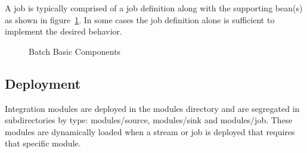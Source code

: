 \par

A job is typically comprised of a job definition along with the supporting
bean(s) as shown in figure~\ref{fig:batchmbc}.
In some cases the job definition alone is sufficient to implement the desired behavior.

\par

\begin{figure}
\centering
{}
\caption{Batch Basic Components}
\label{fig:batchmbc}
\end{figure}

\subsection{Deployment}
Integration modules are deployed in the modules directory and are segregated in
subdirectories by type: modules/source, modules/sink and modules/job.
These modules are dynamically loaded when a stream or job is deployed that requires that
specific module.

\par

